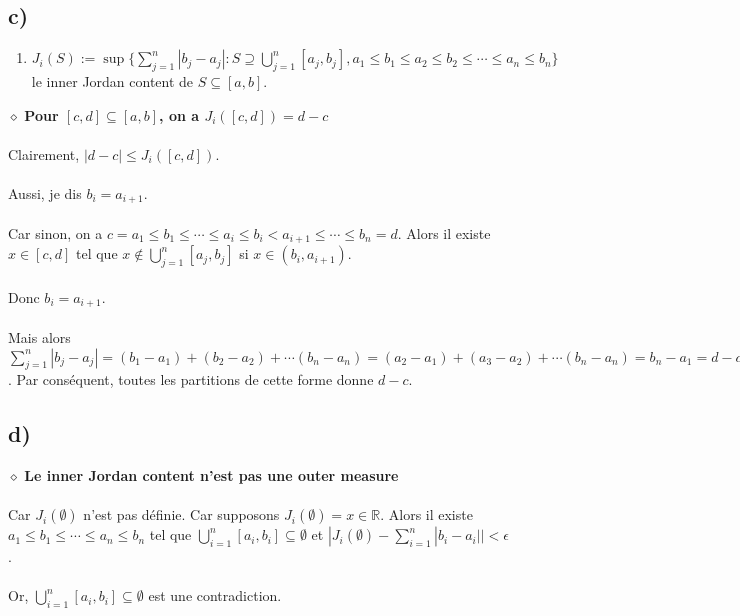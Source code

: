 \documentclass[a4paper,10pt]{article}
\begin{document}
\subsection*{c)}
\begin{enumerate}
	\item $J_i (S) := \sup \{\sum_{j=1}^n |b_j - a_j| : S \supseteq \bigcup_{j=1}^n [a_j,b_j], a_1 \leq b_1 \leq a_2 \leq b_2 \leq \cdots \leq a_n \leq b_n\}$ le inner Jordan content de $S \subseteq [a,b]$.
\end{enumerate}
$\diamond$ \textbf{Pour $[c,d] \subseteq [a,b]$, on a $J_i ([c,d]) = d - c$}
\\
\\
Clairement, $|d - c| \leq J_i ([c,d])$. 
\\
\\
Aussi, je dis $b_i = a_{i+1}$.
\\
\\
Car sinon, on a $c = a_1 \leq b_1 \leq \cdots \leq a_i \leq b_i < a_{i+1} \leq \cdots \leq b_n = d$. Alors il existe $x \in [c,d]$ tel que $x \not \in \bigcup_{j=1}^n [a_j, b_j]$ si $x \in (b_i, a_{i+1})$.
\\
\\
Donc $b_i = a_{i+1}$.
\\
\\
Mais alors $\sum_{j=1}^n |b_j - a_j| = (b_1 - a_1) + (b_2 - a_2) + \cdots (b_n - a_n) = (a_2 - a_1) + (a_3 - a_2) + \cdots (b_n - a_n) = b_n - a_1 = d - c$. Par conséquent, toutes les partitions de cette forme donne $d - c$.

\subsection*{d)}
$\diamond$ \textbf{Le inner Jordan content n'est pas une outer measure}
\\
\\
Car $J_i (\emptyset)$ n'est pas définie. Car supposons $J_i (\emptyset) = x \in \mathbb{R}$. Alors il existe $a_1 \leq b_1 \leq \cdots \leq a_n \leq b_n$ tel que $\bigcup_{i=1}^n [a_i,b_i] \subseteq \emptyset$ et $|J_i (\emptyset) - \sum_{i=1}^n |b_i - a_i| | < \epsilon$.
\\
\\
Or, $\bigcup_{i=1}^n [a_i, b_i] \subseteq \emptyset$ est une contradiction.
\end{document}
